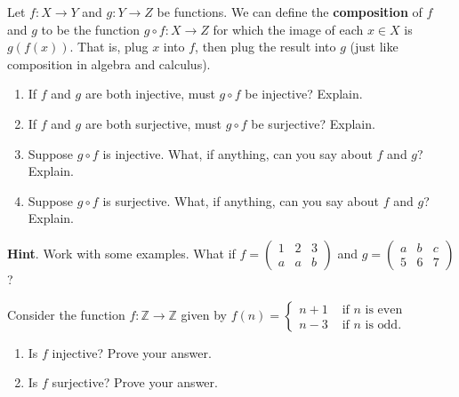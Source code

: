 \documentclass[10pt,]{book}
\newcommand{\terminology}[1]{\textbf{#1}}
\theoremstyle{plain}
\theoremstyle{definition}
\theoremstyle{definition}
\theoremstyle{definition}
\theoremstyle{definition}
\numberwithin{equation}{chapter}
\def\Z{\mathbb Z}
\newcommand{\twoline}[2]{\begin{pmatrix}#1 \\ #2 \end{pmatrix}}
\newcommand{\amp}{&}
\begin{document}
\begin{divisionexercise}{13}\hypertarget{exercise-215}{}
\hypertarget{p-1864}{}%
Let \(f:X \to Y\) and \(g:Y \to Z\) be functions.  We can define the \terminology{composition} of \(f\) and \(g\) to be the function \(g\circ f:X \to Z\) for which the image of each \(x \in X\) is \(g(f(x))\).  That is, plug \(x\) into \(f\), then plug the result into \(g\) (just like composition in algebra and calculus).%
\par
\hypertarget{p-1865}{}%
\leavevmode%
\begin{enumerate}[label=(\alph*)]
\item\hypertarget{li-629}{}\hypertarget{p-1866}{}%
If \(f\) and \(g\) are both injective, must \(g\circ f\) be injective?  Explain.%
\item\hypertarget{li-630}{}\hypertarget{p-1867}{}%
If \(f\) and \(g\) are both surjective, must \(g\circ f\) be surjective?  Explain.%
\item\hypertarget{li-631}{}\hypertarget{p-1868}{}%
Suppose \(g\circ f\) is injective.  What, if anything, can you say about \(f\) and \(g\)?  Explain.%
\item\hypertarget{li-632}{}\hypertarget{p-1869}{}%
Suppose \(g\circ f\) is surjective.  What, if anything, can you say about \(f\) and \(g\)?  Explain.%
\end{enumerate}
%
\par\smallskip%
\noindent\textbf{Hint}.\hypertarget{hint-93}{}\quad%
\hypertarget{p-1870}{}%
Work with some examples.  What if \(f = \twoline{1\amp 2 \amp 3}{a \amp a \amp b}\) and \(g = \twoline{a\amp b \amp c}{5 \amp 6 \amp 7}\)?%
\end{divisionexercise}%
\begin{divisionexercise}{14}\hypertarget{exercise-216}{}
\hypertarget{p-1876}{}%
Consider the function \(f:\Z \to \Z\) given by \(f(n) = \begin{cases}n+1 \amp  \text{ if }n\text{ is even} \\ n-3 \amp \text{ if }n\text{ is odd} . \end{cases}\) \leavevmode%
\begin{enumerate}[label=(\alph*)]
\item\hypertarget{li-637}{}\hypertarget{p-1877}{}%
Is \(f\) injective? Prove your answer.%
\item\hypertarget{li-638}{}\hypertarget{p-1878}{}%
Is \(f\) surjective? Prove your answer.%
\end{enumerate}
%
\end{divisionexercise}%
\end{document}
